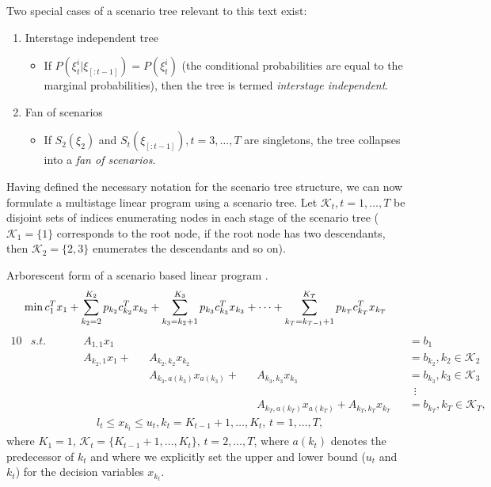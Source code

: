 Two special cases of a scenario tree relevant to this text exist:
\begin{enumerate}
\item Interstage independent tree 
	\begin{itemize}
		\item If $P(\xi_t^i|\xi_{[:t-1]})=P(\xi_t^i)$ (the conditional probabilities are equal to the marginal probabilities), then the tree is termed \textit{interstage independent}.
	\end{itemize}
\item Fan of scenarios
	\begin{itemize}
		\item If $S_2(\xi_2)$ and $S_t(\xi_{[:t-1]}), t=3,\dots,T$ are singletons, the tree collapses into a 		\textit{fan of scenarios}.
	\end{itemize}
\end{enumerate}
Having defined the necessary notation for the scenario tree structure, we can now formulate a multistage linear program using a scenario tree. Let $\mathcal{K}_t, t=1,\dots,T$ be disjoint sets of indices enumerating nodes in each stage of the scenario tree ($\mathcal{K}_1=\{1\}$ corresponds to the root node, if the root node has two descendants, then $\mathcal{K}_2=\{2,3\}$ enumerates the descendants and so on).
\newpage
\begin{defn}{Arborescent form of a scenario based linear program \cite[p. 3]{dupacova_scenarios_for_multistage_stochastic_programs}}.
\label{eq:arborescent_linear_programming_formulation}
\footnotesize
\begin{equation}
\mathrm{min} \, c_1^Tx_1 + \sum_{k_2=2}^{K_2}p_{k_2}c_{k_2}^Tx_{k_2} + \sum_{k_3=k_2+1}^{K_3}p_{k_3}c_{k_3}^Tx_{k_3} + \dots +  \sum_{k_T=k_{T-1}+1}^{K_T}p_{k_T}c_{k_T}^Tx_{k_T} \\
\end{equation}
\vspace{-0.5cm}
\begin{alignat}{10}
& s.t. && \, && A_{1,1}x_1 && && \,&&=b_1 \nonumber \\
& && && A_{k_2,1}x_1  + &&A_{k_2,k_2}x_{k_2} && &&=b_{k_2}, k_2 \in \mathcal{K}_2 \nonumber \\
& && && && A_{k_3,a(k_3)}x_{a(k_3)}  + && A_{k_3,k_3}x_{k_3} &&=b_{k_3} , k_3 \in \mathcal{K}_3 \nonumber \\
& && && && && &&  \, \, \, \vdots \nonumber \\
& && && && && A_{k_T,a(k_T)}x_{a(k_T)}  +  A_{k_T,k_T}x_{k_T} &&=b_{k_T} , k_T \in \mathcal{K}_T, \nonumber
\end{alignat}
\vspace{-0.5cm}
\begin{align*}
& l_t \leq x_{k_t} \leq u_t, k_t=K_{t-1}+1,\dots,K_t, \, t=1,\dots,T,  \nonumber
\end{align*}
\normalsize
where $K_1=1$, $\mathcal{K}_t=\{K_{t-1}+1,\dots,K_t\}, \, t=2,\dots,T$, where $a(k_t)$ denotes the predecessor of $k_t$ and where we explicitly set the upper and lower bound ($u_t$ and $k_t$) for the decision variables $x_{k_t}$.
\end{defn}
